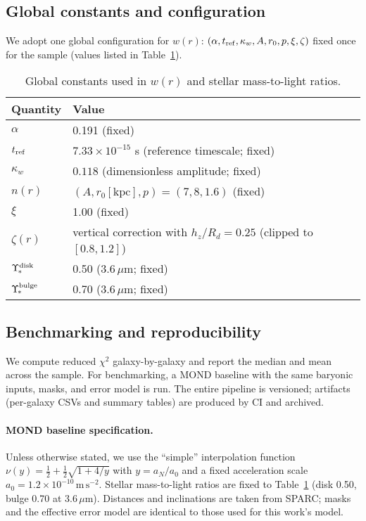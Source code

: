 \documentclass[twocolumn,prd,amsmath,amssymb,aps,superscriptaddress,nofootinbib]{revtex4-2}
\begin{document}
\subsection{Global constants and configuration}
We adopt one global configuration for $w(r)$: $(\alpha,t_{\rm ref},\kappa_{w},A,r_0,p,\xi,\zeta)$ fixed once for the sample (values listed in Table~\ref{tab:globals}).

\begin{table}[t]
\centering
\caption{Global constants used in $w(r)$ and stellar mass-to-light ratios.}
\label{tab:globals}
\begin{tabular}{l l}
\toprule
Quantity & Value\\
\midrule
$\alpha$ & 0.191 (fixed)\\
$t_{\rm ref}$ & $7.33\times10^{-15}$ s (reference timescale; fixed)\\
$\kappa_{w}$ & $0.118$ (dimensionless amplitude; fixed)\\
$n(r)$ & $(A, r_0[\mathrm{kpc}], p)=(7,8,1.6)$ (fixed)\\
$\xi$ & 1.00 (fixed)\\
$\zeta(r)$ & vertical correction with $h_z/R_d=0.25$ (clipped to $[0.8,1.2]$)\\
$\Upsilon_{\!*}^{\rm disk}$ & 0.50 (3.6$\,\mu$m; fixed)\\
$\Upsilon_{\!*}^{\rm bulge}$ & 0.70 (3.6$\,\mu$m; fixed)\\
\bottomrule
\end{tabular}
\end{table}

\subsection{Benchmarking and reproducibility}
We compute reduced $\chi^2$ galaxy-by-galaxy and report the median and mean across the sample. For benchmarking, a MOND baseline with the same baryonic inputs, masks, and error model is run. The entire pipeline is versioned; artifacts (per-galaxy CSVs and summary tables) are produced by CI and archived.

\paragraph*{MOND baseline specification.} Unless otherwise stated, we use the “simple” interpolation function $\nu(y)=\tfrac12+\tfrac12\sqrt{1+4/y}$ with $y=a_N/a_0$ and a fixed acceleration scale $a_0=1.2\times10^{-10}\,\mathrm{m\,s^{-2}}$. Stellar mass-to-light ratios are fixed to Table~\ref{tab:globals} (disk 0.50, bulge 0.70 at 3.6$\,\mu$m). Distances and inclinations are taken from SPARC; masks and the effective error model are identical to those used for this work’s model.
\end{document}
